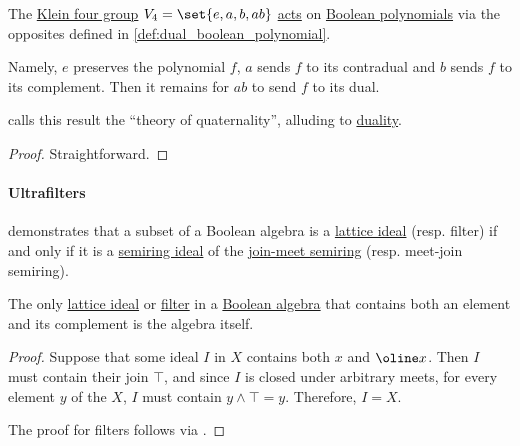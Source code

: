 \begin{proposition}\label{thm:klein_four_group_action_on_boolean_polynomials}
  The \hyperref[def:klein_four_group]{Klein four group} \( V_4 = \set{ e, a, b, ab } \) \hyperref[def:group_action]{acts} on \hyperref[def:free_boolean_algebra/polynomial]{Boolean polynomials} via the opposites defined in \cref{def:dual_boolean_polynomial}.

  Namely, \( e \) preserves the polynomial \( f \), \( a \) sends \( f \) to its contradual and \( b \) sends \( f \) to its complement. Then it remains for \( ab \) to send \( f \) to its dual.
\end{proposition}
\begin{comments}
  \item \Textcite{Gottschalk1953Quaternality} calls this result the \enquote{theory of quaternality}, alluding to \hyperref[con:duality]{duality}.
\end{comments}
\begin{proof}
  Straightforward.
\end{proof}

\paragraph{Ultrafilters}

\begin{remark}\label{rem:boolean_algebra_ideal}
   demonstrates that a subset of a Boolean algebra is a \hyperref[def:lattice_ideal]{lattice ideal} (resp. filter) if and only if it is a \hyperref[def:semiring_ideal]{semiring ideal} of the \hyperref[def:lattice_as_semiring]{join-meet semiring} (resp. meet-join semiring).
\end{remark}

\begin{proposition}\label{thm:improper_boolean_ideal}
  The only \hyperref[def:lattice_ideal]{lattice ideal} or \hyperref[def:lattice_ideal]{filter} in a \hyperref[def:boolean_algebra]{Boolean algebra} that contains both an element and its complement is the algebra itself.
\end{proposition}
\begin{proof}
  Suppose that some ideal \( I \) in \( X \) contains both \( x \) and \( \oline x \). Then \( I \) must contain their join \( \top \), and since \( I \) is closed under arbitrary meets, for every element \( y \) of the \( X \), \( I \) must contain \( y \wedge \top = y \). Therefore, \( I = X \).

  The proof for filters follows via .
\end{proof}

